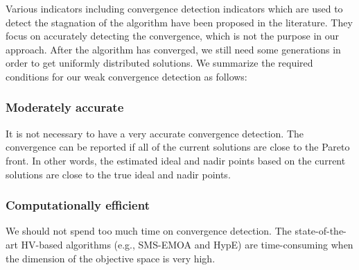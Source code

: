\documentclass[conference]{IEEEtran}
\begin{document}
%
%
%
Various indicators including convergence detection indicators which are used to detect the stagnation of the algorithm 
have been proposed in the literature\cite{convergenceDetection:1, convergenceDetection:LSSC, 
convergenceDetection:OCD, convergenceDetection:OFCDandOCD, convergenceDetection:convergenceMetric, 
convergenceDetection:maxCD, convergenceDetection:online}. 
They focus on accurately detecting the convergence, which is not the purpose in our approach.
After the algorithm has converged, we still need some generations in order to
get uniformly distributed solutions. 
We summarize the required conditions for our weak convergence detection as follows:
\subsubsection{Moderately accurate} It is not necessary to have a very accurate convergence detection. 
The convergence can be reported if all of the current solutions are close to the Pareto front.
In other words, the estimated ideal and nadir points based on the current solutions
are close to the true ideal and nadir points. 
\subsubsection{Computationally efficient} We should not spend too much time on convergence detection. 
The state-of-the-art HV-based algorithms (e.g., SMS-EMOA and HypE) 
are time-consuming when the dimension of the objective space is very high. 
\end{document}
